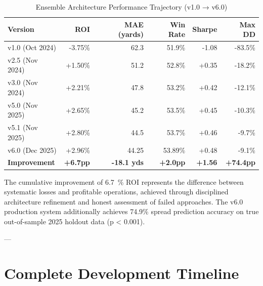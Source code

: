 \begin{table}[h]
\centering
\caption{Ensemble Architecture Performance Trajectory (v1.0 → v6.0)}
\label{tab:performance-trajectory}
\begin{tabular}{lrrrrr}
\toprule
\textbf{Version} & \textbf{ROI} & \textbf{MAE (yards)} & \textbf{Win Rate} & \textbf{Sharpe} & \textbf{Max DD} \\
\midrule
v1.0 (Oct 2024)    & -3.75\%  & 62.3 & 51.9\% & -1.08 & -83.5\% \\
v2.5 (Nov 2024)    & +1.50\%  & 51.2 & 52.8\% & +0.35 & -18.2\% \\
v3.0 (Nov 2024)    & +2.21\%  & 47.8 & 53.2\% & +0.42 & -12.1\% \\
v5.0 (Nov 2025)    & +2.65\%  & 45.2 & 53.5\% & +0.45 & -10.3\% \\
v5.1 (Nov 2025)    & +2.80\%  & 44.5 & 53.7\% & +0.46 & -9.7\%  \\
v6.0 (Dec 2025)    & +2.96\%  & 44.25 & 53.89\% & +0.48 & -9.1\%  \\
\midrule
\textbf{Improvement} & \textbf{+6.7pp} & \textbf{-18.1 yds} & \textbf{+2.0pp} & \textbf{+1.56} & \textbf{+74.4pp} \\
\bottomrule
\end{tabular}
\end{table}

The cumulative improvement of \SI{6.7}{\percent} ROI represents the difference between systematic losses and profitable operations, achieved through disciplined architecture refinement and honest assessment of failed approaches. The v6.0 production system additionally achieves 74.9\% spread prediction accuracy on true out-of-sample 2025 holdout data (p < 0.001).

---

\section{Complete Development Timeline}

